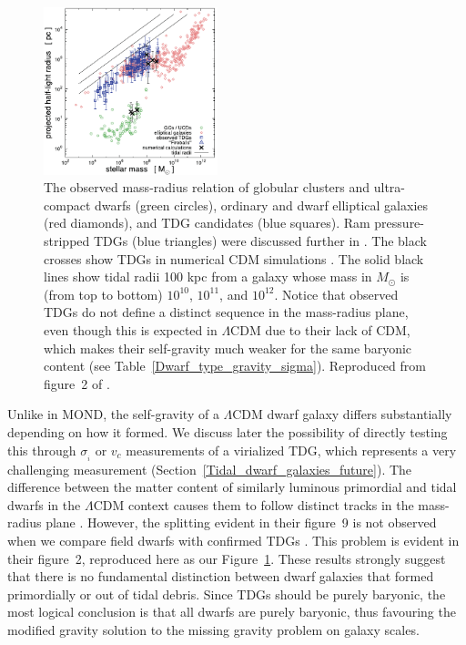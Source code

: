 \documentclass[fleqn,usenatbib,useAMS]{mnras} %
\begin{document}
\begin{figure}
	\centering
	\includegraphics[width=0.45\textwidth]{Dabringhausen_2013_Figure_2}
	\caption{The observed mass-radius relation of globular clusters and ultra-compact dwarfs (green circles), ordinary and dwarf elliptical galaxies (red diamonds), and TDG candidates (blue squares). Ram pressure-stripped TDGs (blue triangles) were discussed further in \citet{Haslbauer_2019}. The black crosses show TDGs in numerical CDM simulations \citep{Wetzstein_2007}. The solid black lines show tidal radii 100 kpc from a galaxy whose mass in $M_\odot$ is (from top to bottom) $10^{10}$, $10^{11}$, and $10^{12}$. Notice that observed TDGs do not define a distinct sequence in the mass-radius plane, even though this is expected in $\Lambda$CDM \citep{Haslbauer_2019} due to their lack of CDM, which makes their self-gravity much weaker for the same baryonic content (see Table~\ref{Dwarf_type_gravity_sigma}). Reproduced from figure~2 of \citet{Dabringhausen_2013}.}
	\label{Dabringhausen_2013_Figure_2}
\end{figure}

Unlike in MOND, the self-gravity of a $\Lambda$CDM dwarf galaxy differs substantially depending on how it formed. We discuss later the possibility of directly testing this through $\sigma_{_i}$ or $v_c$ measurements of a virialized TDG, which represents a very challenging measurement (Section~\ref{Tidal_dwarf_galaxies_future}). The difference between the matter content of similarly luminous primordial and tidal dwarfs in the $\Lambda$CDM context causes them to follow distinct tracks in the mass-radius plane \citep{Haslbauer_2019}. However, the splitting evident in their figure~9 is not observed when we compare field dwarfs with confirmed TDGs \citep{Dabringhausen_2013}. This problem is evident in their figure~2, reproduced here as our Figure~\ref{Dabringhausen_2013_Figure_2}. These results strongly suggest that there is no fundamental distinction between dwarf galaxies that formed primordially or out of tidal debris. Since TDGs should be purely baryonic, the most logical conclusion is that all dwarfs are purely baryonic, thus favouring the modified gravity solution to the missing gravity problem on galaxy scales.
\end{document}
